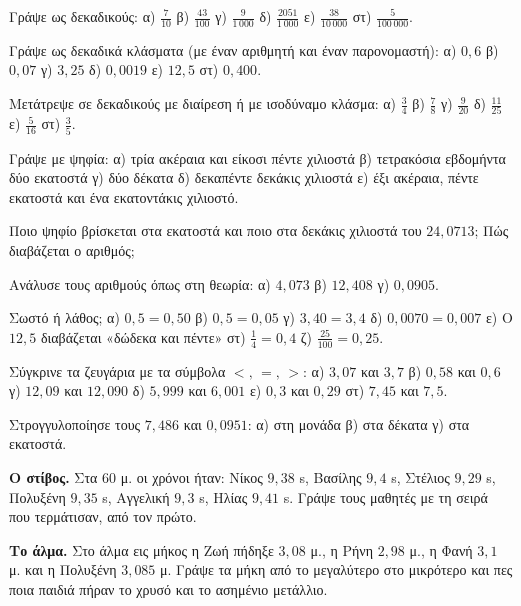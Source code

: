 

\ex Γράψε ως δεκαδικούς: α) $\frac{7}{10}$ \quad β) $\frac{43}{100}$ \quad γ) $\frac{9}{1\,000}$ \quad δ) $\frac{2051}{1\,000}$ \quad ε) $\frac{38}{10\,000}$ \quad στ) $\frac{5}{100\,000}$.

\ex Γράψε ως δεκαδικά κλάσματα (με έναν αριθμητή και έναν παρονομαστή): α) $0{,}6$ \quad β) $0{,}07$ \quad γ) $3{,}25$ \quad δ) $0{,}0019$ \quad ε) $12{,}5$ \quad στ) $0{,}400$.

\ex Μετάτρεψε σε δεκαδικούς με διαίρεση ή με ισοδύναμο κλάσμα: α) $\frac{3}{4}$ \quad β) $\frac{7}{8}$ \quad γ) $\frac{9}{20}$ \quad δ) $\frac{11}{25}$ \quad ε) $\frac{5}{16}$ \quad στ) $\frac{3}{5}$.

\ex Γράψε με ψηφία: α) τρία ακέραια και είκοσι πέντε χιλιοστά \quad β) τετρακόσια εβδομήντα δύο εκατοστά \quad γ) δύο δέκατα \quad δ) δεκαπέντε δεκάκις χιλιοστά \quad ε) έξι ακέραια, πέντε εκατοστά και ένα εκατοντάκις χιλιοστό.

\ex Ποιο ψηφίο βρίσκεται στα εκατοστά και ποιο στα δεκάκις χιλιοστά του $24{,}0713$; Πώς διαβάζεται ο αριθμός;

\ex Ανάλυσε τους αριθμούς όπως στη θεωρία: α) $4{,}073$ \quad β) $12{,}408$ \quad γ) $0{,}0905$.

\ex Σωστό ή λάθος; α) $0{,}5=0{,}50$ \quad β) $0{,}5=0{,}05$ \quad γ) $3{,}40=3{,}4$ \quad δ) $0{,}0070=0{,}007$ \quad ε) Ο $12{,}5$ διαβάζεται «δώδεκα και πέντε» \quad στ) $\frac{1}{4}=0{,}4$ \quad ζ) $\frac{25}{100}=0{,}25$.

\ex Σύγκρινε τα ζευγάρια με τα σύμβολα $<,\,=,\,>$: α) $3{,}07$ και $3{,}7$ \quad β) $0{,}58$ και $0{,}6$ \quad γ) $12{,}09$ και $12{,}090$ \quad δ) $5{,}999$ και $6{,}001$ \quad ε) $0{,}3$ και $0{,}29$ \quad στ) $7{,}45$ και $7{,}5$.

\ex Στρογγυλοποίησε τους $7{,}486$ και $0{,}0951$: α) στη μονάδα \quad β) στα δέκατα \quad γ) στα εκατοστά.


\ex \textbf{Ο στίβος.} Στα 60 μ. οι χρόνοι ήταν: Νίκος $9{,}38$ s, Βασίλης $9{,}4$ s, Στέλιος $9{,}29$ s, Πολυξένη $9{,}35$ s, Αγγελική $9{,}3$ s, Ηλίας $9{,}41$ s. Γράψε τους μαθητές με τη σειρά που τερμάτισαν, από τον πρώτο.

\ex \textbf{Το άλμα.} Στο άλμα εις μήκος η Ζωή πήδηξε $3{,}08$ μ., η Ρήνη $2{,}98$ μ., η Φανή $3{,}1$ μ. και η Πολυξένη $3{,}085$ μ. Γράψε τα μήκη από το μεγαλύτερο στο μικρότερο και πες ποια παιδιά πήραν το χρυσό και το ασημένιο μετάλλιο.

